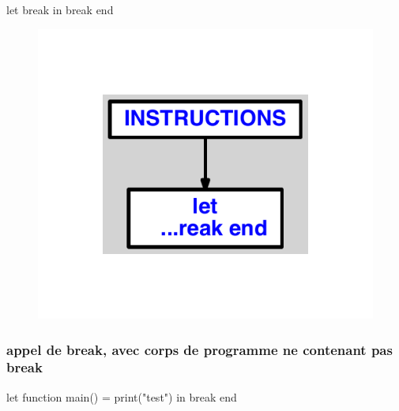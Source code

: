 \documentclass{article}
\begin{document}
\begin{verbatimtab}
let
	break
in break end
\end{verbatimtab}
\begin{figure}[H]\centering\includegraphics[max width=\textwidth]{ast/ast_12.pdf}\end{figure}\subsubsection{appel de break, avec corps de programme ne contenant pas break}
\begin{verbatimtab}
let
	function main() = print("test")
in break end
\end{verbatimtab}
\end{document}

